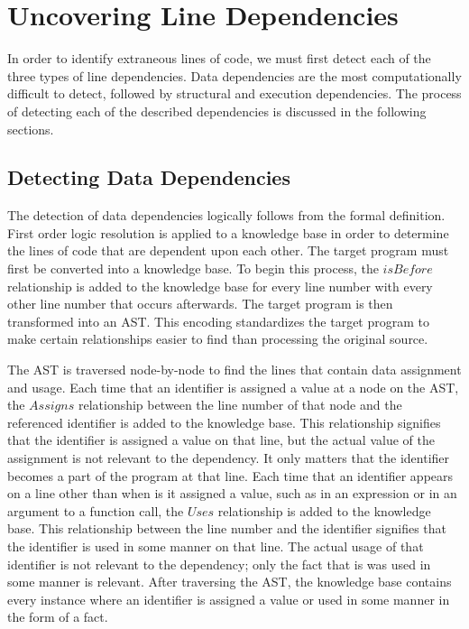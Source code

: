 

\section{Uncovering Line Dependencies}
In order to identify extraneous lines of code, we must first detect each of the three types of line dependencies. Data dependencies are the most computationally difficult to detect, followed by structural and execution dependencies. The process of detecting each of the described dependencies is discussed in the following sections.

\subsection{Detecting Data Dependencies}

The detection of data dependencies logically follows from the formal definition. First order logic resolution is applied to a knowledge base in order to determine the lines of code that are dependent upon each other. The target program must first be converted into a knowledge base. To begin this process, the $isBefore$ relationship is added to the knowledge base for every line number with every other line number that occurs afterwards. The target program is then transformed into an AST. This encoding standardizes the target program to make certain relationships easier to find than processing the original source.


The AST is traversed node-by-node to find the lines that contain data assignment and usage. Each time that an identifier is assigned a value at a node on the AST, the $Assigns$ relationship between the line number of that node and the referenced identifier is added to the knowledge base. This relationship signifies that the identifier is assigned a value on that line, but the actual value of the assignment is not relevant to the dependency. It only matters that the identifier becomes a part of the program at that line. Each time that an identifier appears on a line other than when is it assigned a value, such as in an expression or in an argument to a function call, the $Uses$ relationship is added to the knowledge base. This relationship between the line number and the identifier signifies that the identifier is used in some manner on that line. The actual usage of that identifier is not relevant to the dependency; only the fact that is was used in some manner is relevant. After traversing the AST, the knowledge base contains every instance where an identifier is assigned a value or used in some manner in the form of a fact.

